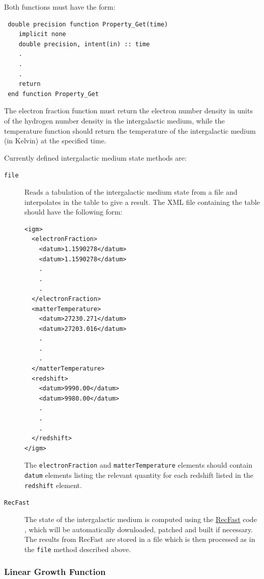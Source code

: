 Both functions must have the form:
\begin{verbatim}
 double precision function Property_Get(time)
    implicit none
    double precision, intent(in) :: time
    .
    .
    .
    return
 end function Property_Get
\end{verbatim}
The electron fraction function must return the electron number density in units of the hydrogen number density in the intergalactic medium, while the temperature function should return the temperature of the intergalactic medium (in Kelvin) at the specified time.

Currently defined intergalactic medium state methods are:
\begin{description}
 \item [{\tt file}] Reads a tabulation of the intergalactic medium state from a file and interpolates in the table to give a result. The XML file containing the table should have the following form:
 \begin{verbatim}
<igm>
  <electronFraction>
    <datum>1.1590278</datum>
    <datum>1.1590278</datum>
    .
    .
    .
  </electronFraction>
  <matterTemperature>
    <datum>27230.271</datum>
    <datum>27203.016</datum>
    .
    .
    .
  </matterTemperature>
  <redshift>
    <datum>9990.00</datum>
    <datum>9980.00</datum>
    .
    .
    .
  </redshift>
</igm>
 \end{verbatim}
 The {\tt electronFraction} and {\tt matterTemperature} elements should contain {\tt datum} elements listing the relevant quantity for each redshift listed in the {\tt redshift} element.
 \item [{\tt RecFast}] The state of the intergalactic medium is computed using the \href{http://www.astro.ubc.ca/people/scott/recfast.html}{{\sc RecFast}} code \cite{seager_how_2000,wong_how_2008}, which will be automatically downloaded, patched and built if necessary. The results from {\sc RecFast} are stored in a file which is then processed as in the {\tt file} method described above.
\end{description}

\subsubsection{Linear Growth Function}

